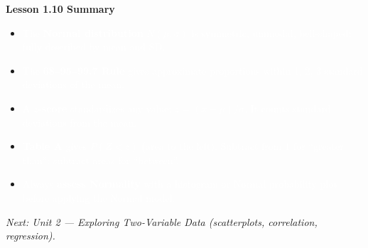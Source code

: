 \documentclass[aspectratio=169, 11pt]{beamer}
\begin{document}
{
\begin{frame}[t, plain]
  \vspace{1.5cm}
  \hspace{0.55cm}%
  \begin{minipage}{0.9\textwidth}
    {\color{goldacc}\bfseries\large Lesson 1.10 Summary}

    \vspace{0.5cm}
    \small
    \begin{itemize}
      \setlength{\itemsep}{0.5em}
      \item \textcolor{white}{The {\color{goldacc}\bfseries Normal distribution} $N(\mu, \sigma)$ is symmetric, unimodal,
            bell-shaped; fully described by mean and SD.}
      \item \textcolor{white}{The {\color{goldacc}\bfseries 68--95--99.7 Rule} gives approximate proportions within
            1, 2, 3 standard deviations of the mean.}
      \item \textcolor{white}{A {\color{goldacc}\bfseries $z$-score} standardizes any value: $z = (x-\mu)/\sigma$.
            It counts standard deviations from the mean.}
      \item \textcolor{white}{{\color{goldacc}\bfseries Table A} gives $P(Z < z)$ (area to the left).
            Subtract from 1 for ``greater than''; subtract areas for ``between''.}
      \item \textcolor{white}{Always {\color{goldacc}\bfseries assess Normality} with a histogram or Normal probability plot
            before applying the Normal model.}
    \end{itemize}

    \vspace{0.6cm}
    {\color{skymid}\small\itshape
      Next: Unit 2 --- Exploring Two-Variable Data (scatterplots, correlation, regression).}
  \end{minipage}
\end{frame}
}
\end{document}
